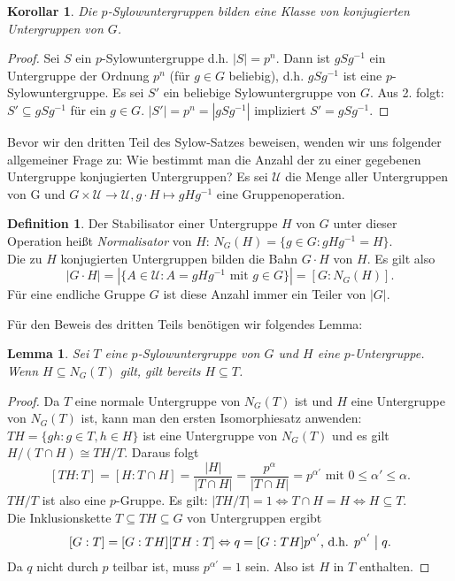 \documentclass[12pt]{scrartcl} %
\newcommand{\divides}{\bigm|}
\newtheorem{lemma}{Lemma}
\newtheorem{kor}{Korollar}
\theoremstyle{definition}
\newtheorem*{defn}{Definition}
\theoremstyle{remark}
\begin{document}
\begin{kor}
	Die $p$-Sylowuntergruppen bilden eine Klasse von konjugierten Untergruppen von $G$.
\end{kor}

\begin{proof}
	Sei $S$ ein $p$-Sylowuntergruppe d.h. $|S| = p^n$. Dann ist $gSg^{-1}$ ein Untergruppe der Ordnung $p^n$ (für $g \in G$ beliebig), d.h. $gSg^{-1}$ ist eine $p$-Sylowuntergruppe. Es sei $S'$ ein beliebige Sylowuntergruppe von $G$. Aus 2. folgt: $S' \subseteq gSg^{-1}$ für ein $g \in G$. $|S'| = p^n = |gSg^{-1}|$ impliziert $S' = gSg^{-1}$.
\end{proof}

Bevor wir den dritten Teil des Sylow-Satzes beweisen, wenden wir uns folgender allgemeiner Frage zu: Wie bestimmt man die Anzahl der zu einer gegebenen Untergruppe konjugierten Untergruppen? Es sei $\mathcal{U}$ die Menge aller Untergruppen von G und $ G \times \mathcal{U} \rightarrow \mathcal{U}, g \cdot H \mapsto gHg^{-1} $ eine Gruppenoperation.

\begin{defn}
	Der Stabilisator einer Untergruppe $H$ von $G$ unter dieser Operation heißt \emph{Normalisator} von $H$: $N_G(H) = \{ g \in G: gHg^{-1} = H \}$. \\
	Die zu $H$ konjugierten Untergruppen bilden die Bahn $G \cdot H$ von $H$. Es gilt also
	$$ |G \cdot H| = | \{ A \in \mathcal{U} : A = gHg^{-1} \text{ mit } g \in G \} | = [G:N_G(H)] .$$
	Für eine endliche Gruppe $G$ ist diese Anzahl immer ein Teiler von $|G|$.
\end{defn}

Für den Beweis des dritten Teils benötigen wir folgendes Lemma:

\begin{lemma}\label{lem:Sylow}
	Sei $T$ eine $p$-Sylowuntergruppe von $G$ und $H$ eine $p$-Untergruppe. Wenn $H \subseteq N_G(T)$ gilt, gilt bereits $H \subseteq T$.
\end{lemma}

\begin{proof}
	Da $T$ eine normale Untergruppe von $N_G(T)$ ist und $H$ eine Untergruppe von $N_G(T)$ ist, kann man den ersten Isomorphiesatz anwenden: $TH = \{ gh : g \in T, h \in H \}$ ist eine Untergruppe von $N_G(T)$ und es gilt $H/(T \cap H) \cong TH/T$. Daraus folgt
	$$ [TH : T] = [H : T \cap H] = \frac{|H|}{|T \cap H|} = \frac{p^{\alpha}}{|T \cap H|} = p^{\alpha '} \text{ mit } 0 \leq \alpha ' \leq \alpha.$$
	$TH/T$ ist also eine $p$-Gruppe. Es gilt: $|TH/T| = 1 \Leftrightarrow T \cap H = H \Leftrightarrow H \subseteq T$. \\
	Die Inklusionskette $T \subseteq TH \subseteq G$ von Untergruppen ergibt
	$$[G:T] = [G:TH][TH:T] \Leftrightarrow q = [G:TH]p^{\alpha '} \text{, d.h. } p^{\alpha '} \divides q.$$
	Da $q$ nicht durch $p$ teilbar ist, muss $p^{\alpha '} = 1$ sein. Also ist $H$ in $T$ enthalten.
\end{proof}
\end{document}
